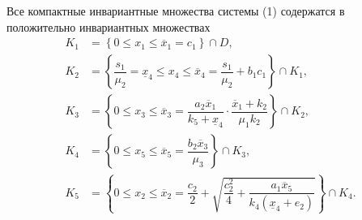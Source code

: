 \documentclass[14pt,a4paper]{extarticle}
\begin{document}
	\begin{theorem}
		Все компактные инвариантные множества системы (1) содержатся в положительно инвариантных множествах
		\begin{align*}
			K_1 &=\left\{0 \leqslant x_1 \leqslant \overline{x}_1 = c_1\right\}\cap D,\\[6pt]
			K_2 &=\left\{\dfrac{s_1}{\mu_2} = \underline{x}_4 \leqslant x_4 \leqslant \overline{x}_4 = \dfrac{s_1}{\mu_2} + b_1c_1\right\}\cap K_1,\\[6pt]
			K_3 &=\left\{0 \leqslant x_3 \leqslant \overline{x}_3 = \dfrac{a_2\overline{x}_1}{k_5+\underline{x}_4}\cdot\dfrac{\overline{x}_1+k_2}{\mu_1k_2}\right\}\cap K_2,\\[6pt]
			K_4 &=\left\{0 \leqslant x_5 \leqslant \overline{x}_5 = \dfrac{b_2\overline{x}_3}{\mu_3}\right\}\cap K_3,\\[6pt]
			K_5 &=\left\{0 \leqslant x_2 \leqslant \overline{x}_2 =  \dfrac{c_2}{2}+\sqrt{\dfrac{c_2^2}{4}+\dfrac{a_1\overline{x}_5}{k_4(\underline{x}_4+e_2)}}\right\}\cap K_4.
		\end{align*}
	\end{theorem}
\end{document}
